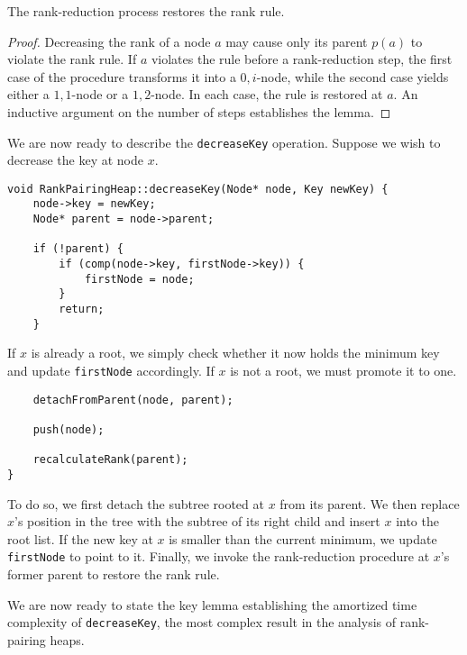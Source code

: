 \begin{lemma}
The rank-reduction process restores the rank rule.
\end{lemma}
\begin{proof}
Decreasing the rank of a node \(a\) may cause only its parent \(p(a)\) to violate the rank rule. If \(a\) violates the rule before a rank-reduction step, the first case of the procedure transforms it into a \(0,i\)-node, while the second case yields either a \(1,1\)-node or a \(1,2\)-node. In each case, the rule is restored at \(a\). An inductive argument on the number of steps establishes the lemma.
\end{proof}

We are now ready to describe the \texttt{decreaseKey} operation. Suppose we wish to decrease the key at node \(x\).

\begin{verbatim}
void RankPairingHeap::decreaseKey(Node* node, Key newKey) {
    node->key = newKey;
    Node* parent = node->parent;
    
    if (!parent) {
        if (comp(node->key, firstNode->key)) {
            firstNode = node;
        }
        return;
    }
\end{verbatim}

If \(x\) is already a root, we simply check whether it now holds the minimum key and update \texttt{firstNode} accordingly. If \(x\) is not a root, we must promote it to one.

\begin{verbatim}
    detachFromParent(node, parent);
    
    push(node);
    
    recalculateRank(parent);
}
\end{verbatim}

To do so, we first detach the subtree rooted at \(x\) from its parent. We then replace \(x\)'s position in the tree with the subtree of its right child and insert \(x\) into the root list. If the new key at \(x\) is smaller than the current minimum, we update \texttt{firstNode} to point to it. Finally, we invoke the rank-reduction procedure at \(x\)'s former parent to restore the rank rule.

We are now ready to state the key lemma establishing the amortized time complexity of \texttt{decreaseKey}, the most complex result in the analysis of rank-pairing heaps.

